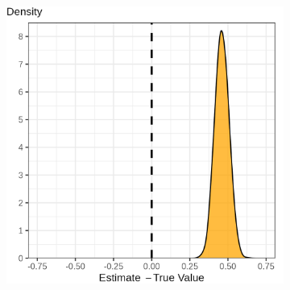 \documentclass[dvipsnames]{beamer} %
\begin{document}
\begin{frame}
{{\begin{figure}
\begin{subfigure}[c]{0.525\textwidth}
                \includegraphics[width=\textwidth]{
                    ../text/sections/figures/ols-indirect-dist.png}
            \end{subfigure}
        \end{figure}
    }}
\end{frame}
\end{document}
